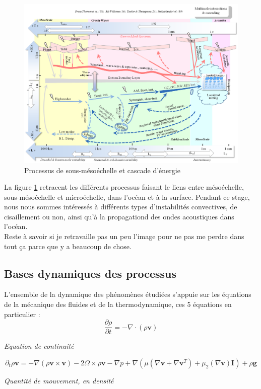 \documentclass{rapportECC}
\begin{document}
\begin{figure}[H]
    \centering
    \includegraphics[width=1
    \textwidth]{images/sous_meso.png}
    \caption{Processus de sous-mésoéchelle et cascade d'énergie}
    \label{fig:echelles}
\end{figure}

La figure \ref{fig:echelles} retracent les différents processus faisant le liens entre mésoéchelle, sous-mésoéchelle et microéchelle, dans l'océan et à la surface. Pendant ce stage, nous nous sommes intéressés à différents types d'instabilités convectives, de cisaillement ou non, ainsi qu'à la propagationd des ondes acoustiques dans l'océan.
\\
Reste à savoir si je retravaille pas un peu l'image pour ne pas me perdre dans tout ça parce que y a beaucoup de chose.

\subsection{Bases dynamiques des processus}
\label{Dynamiques globales}
L'ensemble de la dynamique des phénomènes étudiées s'appuie sur les équations de la mécanique des fluides et de la thermodynamique, ces 5 équations en particulier :
\begin{equation}
    \frac{\partial \rho}{\partial t} = - \nabla \cdot (\rho \mathbf{v})
    \label{eq:continuite}
\end{equation}
\begin{center}
    \textit{Equation de continuité}
\end{center}
\begin{equation}
    \partial_t \rho \mathbf{v} = - \nabla (\rho \mathbf{v} \times \mathbf{v}) - 2\Omega \times \rho \mathbf{v} - \nabla p + \nabla (\mu (\nabla\mathbf{v} + \nabla\mathbf{v}^T) + \mu_2(\nabla \mathbf{v}) \mathbf{I}) +\rho \mathbf{g}
    \label{eq: qtt de mouvement}
\end{equation}
\begin{center}
    \textit{Quantité de mouvement, en densité}
\end{center}
\end{document}
